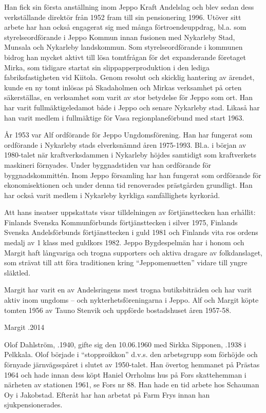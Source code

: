 
Han fick sin första anställning inom Jeppo Kraft Andelslag och blev sedan dess verkställande direktör från 1952  fram till sin pensionering 1996. Utöver sitt arbete har han också engagerat sig med många förtroendeuppdrag, bl.a. som styrelseordförande i Jeppo Kommun innan fusionen med Nykarleby Stad, Munsala och Nykarleby landskommun. Som styrelseordförande i kommunen bidrog han mycket aktivt till lösa tomtfrågan för det expanderande företaget Mirka, som tidigare startat sin slippapperproduktion i den lediga fabriksfastigheten vid Kiitola. Genom resolut och skicklig hantering av ärendet, kunde en ny tomt inlösas på Skadaholmen och Mirkas verksamhet på orten säkerställas, en verksamhet som varit av stor betydelse för Jeppo som ort. Han har varit fullmäktigeledamot både i Jeppo och senare Nykarleby stad. Likaså har han varit  medlem i fullmäktige för Vasa regionplaneförbund med start 1963.

År 1953 var Alf ordförande för Jeppo Ungdomsförening. Han har fungerat som ordförande i Nykarleby stads elverksnämnd åren 1975-1993. Bl.a. i början av 1980-talet när kraftverksdammen i Nykarleby höjdes samtidigt som kraftverkets maskineri förnyades. Under byggnadstiden var han ordförande för byggnadskommittén. Inom Jeppo församling har han fungerat som ordförande för ekonomisektionen och under denna tid renoverades prästgården grundligt. Han har också varit medlem i Nykarleby kyrkliga samfällighets kyrkoråd.

Att hans insatser uppskattats visar tilldelningen av förtjänsttecken han erhållit: Finlands Svenska Kommunförbunds förtjänsttecken i silver 1975, Finlands Svenska Andelsförbunds förtjänsttecken i guld 1981 och Finlands vita ros ordens medalj av 1 klass med guldkors 1982. Jeppo Bygdespelmän har i honom och Margit haft långvariga och trogna supporters och aktiva dragare av folkdanslaget, som strävat till att föra traditionen kring ``Jeppomenuetten'' vidare till yngre släktled.

Margit har varit en av Andelsringens mest trogna butiksbiträden och har varit aktiv inom ungdoms – och nykterhetsföreningarna i Jeppo. Alf och Margit köpte tomten 1956 av Tauno Stenvik och uppförde bostadshuset åren 1957-58.

Margit .2014




Olof Dahlström, .1940, gifte sig den 10.06.1960 med Sirkka Sipponen, .1938 i Pelkkala. Olof började i ``stopproikkon'' d.v.s. den arbetsgrupp som förhöjde och förnyade järnvägsspåret i slutet av 1950-talet. Han övertog hemmanet på Prästas 1964 och hade innan dess köpt Haniel Orrholms hus på Fors skattehemman i närheten av stationen 1961, se Fors nr 88. Han hade en tid arbete hos Schauman Oy i Jakobstad. Efteråt har han arbetat på Farm Frys innan han sjukpensionerades.


